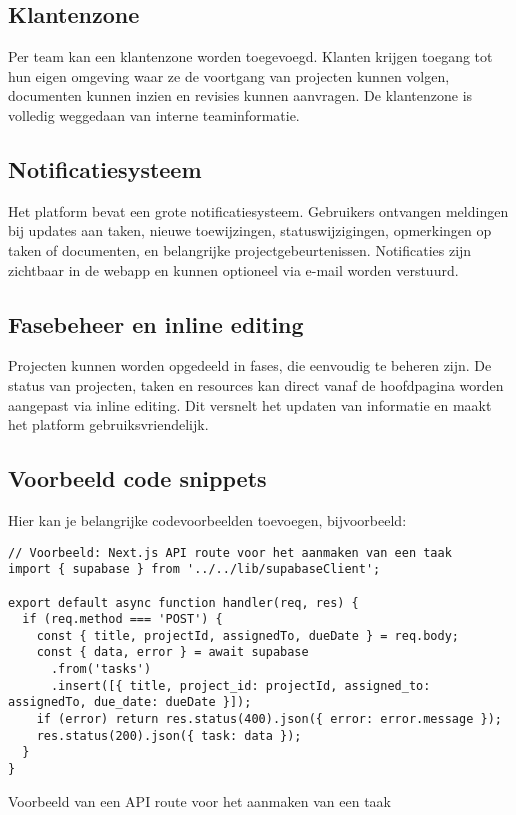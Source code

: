 \subsection{Klantenzone}
Per team kan een klantenzone worden toegevoegd. Klanten krijgen toegang tot hun eigen omgeving waar ze de voortgang van projecten kunnen volgen, documenten kunnen inzien en revisies kunnen aanvragen. De klantenzone is volledig weggedaan van interne teaminformatie.

\subsection{Notificatiesysteem}
Het platform bevat een grote notificatiesysteem. Gebruikers ontvangen meldingen bij updates aan taken, nieuwe toewijzingen, statuswijzigingen, opmerkingen op taken of documenten, en belangrijke projectgebeurtenissen. Notificaties zijn zichtbaar in de webapp en kunnen optioneel via e-mail worden verstuurd.

\subsection{Fasebeheer en inline editing}
Projecten kunnen worden opgedeeld in fases, die eenvoudig te beheren zijn. De status van projecten, taken en resources kan direct vanaf de hoofdpagina worden aangepast via inline editing. Dit versnelt het updaten van informatie en maakt het platform gebruiksvriendelijk.

\subsection{Voorbeeld code snippets}
Hier kan je belangrijke codevoorbeelden toevoegen, bijvoorbeeld:
\begin{listing}[H]
\begin{verbatim}
// Voorbeeld: Next.js API route voor het aanmaken van een taak
import { supabase } from '../../lib/supabaseClient';

export default async function handler(req, res) {
  if (req.method === 'POST') {
    const { title, projectId, assignedTo, dueDate } = req.body;
    const { data, error } = await supabase
      .from('tasks')
      .insert([{ title, project_id: projectId, assigned_to: assignedTo, due_date: dueDate }]);
    if (error) return res.status(400).json({ error: error.message });
    res.status(200).json({ task: data });
  }
}
\end{verbatim}
\caption{Voorbeeld van een API route voor het aanmaken van een taak}
\end{listing}

